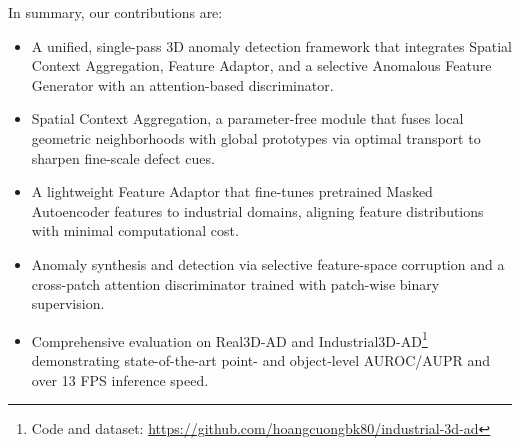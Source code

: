 In summary, our contributions are:
\begin{itemize}
\item A unified, single-pass 3D anomaly detection framework that integrates Spatial Context Aggregation, Feature Adaptor, and a selective Anomalous Feature Generator with an attention-based discriminator.
\item Spatial Context Aggregation, a parameter-free module that fuses local geometric neighborhoods with global prototypes via optimal transport to sharpen fine-scale defect cues.
\item A lightweight Feature Adaptor that fine-tunes pretrained Masked Autoencoder features to industrial domains, aligning feature distributions with minimal computational cost.
\item Anomaly synthesis and detection via selective feature-space corruption and a cross-patch attention discriminator trained with patch-wise binary supervision.
\item Comprehensive evaluation on Real3D-AD and Industrial3D-AD\footnote{Code and dataset: \url{https://github.com/hoangcuongbk80/industrial-3d-ad}} demonstrating state-of-the-art point- and object-level AUROC/AUPR and over 13 FPS inference speed.
\end{itemize}
